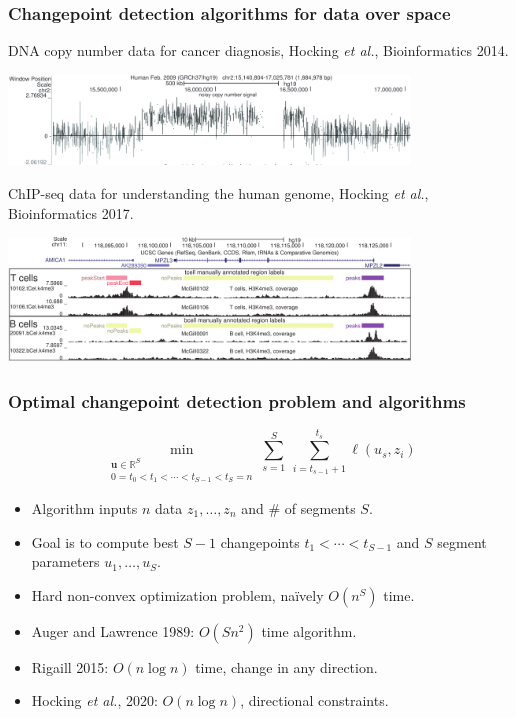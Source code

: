 \documentclass{beamer}
\newcommand{\RR}{\mathbb R}
\begin{document}
\begin{frame}
  \frametitle{Changepoint detection algorithms for data over space}

  DNA copy number data for cancer diagnosis, Hocking \emph{et
    al.}, Bioinformatics 2014.

  \includegraphics[width=0.8\textwidth]{intro-breakpoints}

  ChIP-seq data for understanding the human genome, Hocking 
  \emph{et al.}, Bioinformatics 2017.

  \includegraphics[width=0.8\textwidth]{intro-peaks}

\end{frame}

\begin{frame}
  \frametitle{Optimal changepoint detection problem and algorithms}
  
  \vskip -1cm    
$$
\min_{\substack{
  \mathbf u\in\RR^{S}
\\
   0=t_0<t_1<\cdots<t_{S-1}<t_S=n
  }} 
    \sum_{s=1}^S\  \sum_{i=t_{s-1}+1}^{t_s} \ell( u_s,  z_i) 
$$
  \begin{itemize}
  \item Algorithm inputs $n$ data $z_1, \dots, z_n$ and \# of segments $S$.
  \item Goal is to compute best $S-1$ changepoints
    $t_1 < \cdots < t_{S-1}$ and $S$ segment parameters $u_1,\dots,u_S$.
  \item Hard non-convex optimization problem, na\" ively $O(n^S)$ time.
  \item Auger and Lawrence 1989: $O(Sn^2)$ time algorithm.
  \item Rigaill 2015: $O(n \log n)$ time, change in any direction.
  \item Hocking \emph{et al.}, 2020: $O(n \log n)$, directional constraints.
  \end{itemize}
\end{frame}
\end{document}
